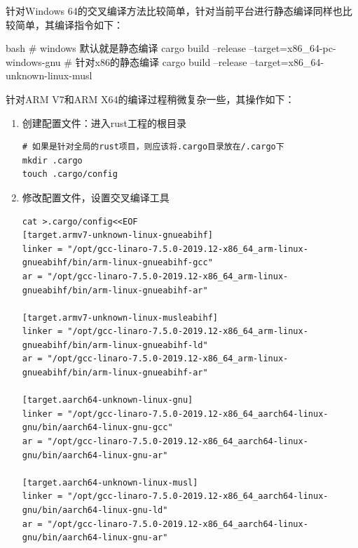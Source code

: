 针对Windows 64的交叉编译方法比较简单，针对当前平台进行静态编译同样也比较简单，其编译指令如下：
\begin{code-block}{bash}
# windows 默认就是静态编译
cargo build --release --target=x86_64-pc-windows-gnu
# 针对x86的静态编译
cargo build --release --target=x86_64-unknown-linux-musl
\end{code-block}

针对ARM V7和ARM X64的编译过程稍微复杂一些，其操作如下：
\begin{enumerate}
  \item 创建配置文件：进入rust工程的根目录
\begin{mdframed}[topline=false, bottomline=false, leftline=false,
    rightline=false, backgroundcolor=lbcolor]
\begin{verbatim}
# 如果是针对全局的rust项目，则应该将.cargo目录放在/.cargo下
mkdir .cargo
touch .cargo/config
\end{verbatim}
\end{mdframed}

  \item 修改配置文件，设置交叉编译工具
\begin{mdframed}[topline=false, bottomline=false, leftline=false,
    rightline=false, backgroundcolor=lbcolor]
\begin{verbatim}
cat >.cargo/config<<EOF
[target.armv7-unknown-linux-gnueabihf]
linker = "/opt/gcc-linaro-7.5.0-2019.12-x86_64_arm-linux-gnueabihf/bin/arm-linux-gnueabihf-gcc"
ar = "/opt/gcc-linaro-7.5.0-2019.12-x86_64_arm-linux-gnueabihf/bin/arm-linux-gnueabihf-ar"

[target.armv7-unknown-linux-musleabihf]
linker = "/opt/gcc-linaro-7.5.0-2019.12-x86_64_arm-linux-gnueabihf/bin/arm-linux-gnueabihf-ld"
ar = "/opt/gcc-linaro-7.5.0-2019.12-x86_64_arm-linux-gnueabihf/bin/arm-linux-gnueabihf-ar"

[target.aarch64-unknown-linux-gnu]
linker = "/opt/gcc-linaro-7.5.0-2019.12-x86_64_aarch64-linux-gnu/bin/aarch64-linux-gnu-gcc"
ar = "/opt/gcc-linaro-7.5.0-2019.12-x86_64_aarch64-linux-gnu/bin/aarch64-linux-gnu-ar"

[target.aarch64-unknown-linux-musl]
linker = "/opt/gcc-linaro-7.5.0-2019.12-x86_64_aarch64-linux-gnu/bin/aarch64-linux-gnu-ld"
ar = "/opt/gcc-linaro-7.5.0-2019.12-x86_64_aarch64-linux-gnu/bin/aarch64-linux-gnu-ar"


\end{verbatim}
\end{mdframed}
\end{enumerate}
